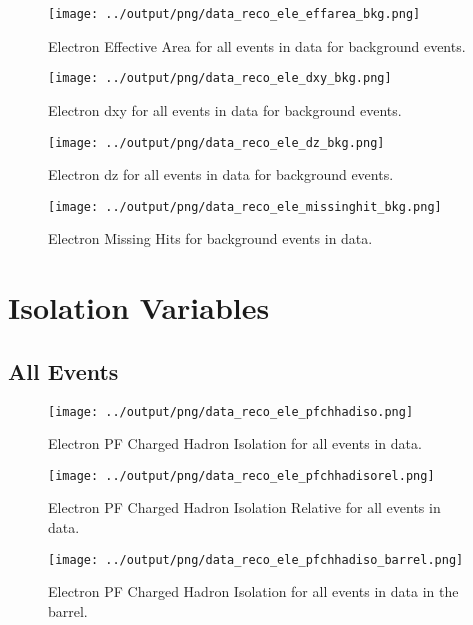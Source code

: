 \documentclass[11pt]{book}
\begin{document}
\begin{figure}[htb]
\centering
\texttt{[image: ../output/png/data\_reco\_ele\_effarea\_bkg.png]}
\caption{Electron Effective Area for all events in data for background events.}
\label{fig:data_ele_effarea_bkg}
\end{figure}

\begin{figure}[htb]
\centering
\texttt{[image: ../output/png/data\_reco\_ele\_dxy\_bkg.png]}
\caption{Electron dxy for all events in data for background events.}
\label{fig:data_ele_dxy_bkg}
\end{figure}

\begin{figure}[htb]
\centering
\texttt{[image: ../output/png/data\_reco\_ele\_dz\_bkg.png]}
\caption{Electron dz for all events in data for background events.}
\label{fig:data_ele_dz_bkg}
\end{figure}

\begin{figure}[htb]
\centering
\texttt{[image: ../output/png/data\_reco\_ele\_missinghit\_bkg.png]}
\caption{Electron Missing Hits for background events in data.}
\label{fig:data_ele_missinghĩt_bkg}
\end{figure}
\clearpage

\chapter{Isolation Variables}
\section{All Events}

\begin{figure}[htb]
\centering
\texttt{[image: ../output/png/data\_reco\_ele\_pfchhadiso.png]}
\caption{Electron PF Charged Hadron Isolation for all events in data.}
\label{fig:data_ele_pfchhadiso}
\end{figure}

\begin{figure}[htb]
\centering
\texttt{[image: ../output/png/data\_reco\_ele\_pfchhadisorel.png]}
\caption{Electron PF Charged Hadron Isolation Relative for all events in data.}
\label{fig:data_ele_pfchhadisorel}
\end{figure}

\begin{figure}[htb]
\centering
\texttt{[image: ../output/png/data\_reco\_ele\_pfchhadiso\_barrel.png]}
\caption{Electron PF Charged Hadron Isolation for all events in data in the barrel.}
\label{fig:data_ele_pfchhadiso_barrel}
\end{figure}
\clearpage
\end{document}
